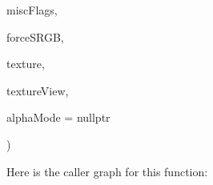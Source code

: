 {\begin{DoxyParamCaption}
\item[{\+\_\+\+In\+\_\+ unsigned int}]{misc\+Flags, }
\item[{\+\_\+\+In\+\_\+ bool}]{force\+S\+R\+GB, }
\item[{\+\_\+\+Outptr\+\_\+opt\+\_\+ I\+D3\+D11\+Resource $\ast$$\ast$}]{texture, }
\item[{\+\_\+\+Outptr\+\_\+opt\+\_\+ I\+D3\+D11\+Shader\+Resource\+View $\ast$$\ast$}]{texture\+View, }
\item[{\+\_\+\+Out\+\_\+opt\+\_\+ {\bf D\+D\+S\+\_\+\+A\+L\+P\+H\+A\+\_\+\+M\+O\+DE} $\ast$}]{alpha\+Mode = {\ttfamily nullptr}}
\end{DoxyParamCaption}
)}\hypertarget{namespace_direct_x_a5839b6f2cb71965e2aeddef378e1fe6e_a5839b6f2cb71965e2aeddef378e1fe6e}{}\label{namespace_direct_x_a5839b6f2cb71965e2aeddef378e1fe6e_a5839b6f2cb71965e2aeddef378e1fe6e}


Here is the caller graph for this function\+:


